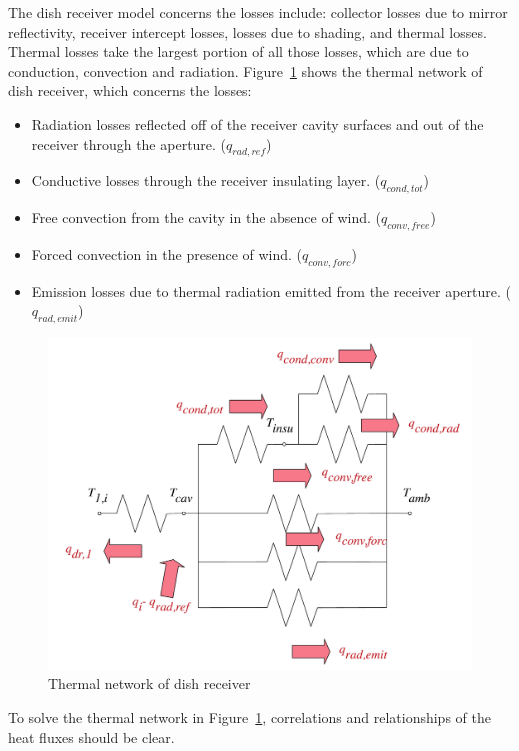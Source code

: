 The dish receiver model concerns the losses include: collector losses due to mirror reflectivity, receiver intercept losses, losses due to shading, and thermal losses. Thermal losses take the largest portion of all those losses, which are due to conduction, convection and radiation. Figure~\ref{fig:thermal-lose} shows the thermal network of dish receiver, which concerns the losses:
\begin{itemize}
	\item Radiation losses reflected off of the receiver cavity surfaces and out of the receiver through the aperture. ($q_{rad,ref}$)
	\item Conductive losses through the receiver insulating layer. ($q_{cond,tot}$)
	\item Free convection from the cavity in the absence of wind. ($q_{conv,free}$)
	\item Forced convection in the presence of wind. ($q_{conv,forc}$)
	\item Emission losses due to thermal radiation emitted from the receiver aperture. ($q_{rad,emit}$)
\end{itemize}

\noindent \begin{figure}[htbp]
\begin{center}
	\includegraphics[width = 0.7\columnwidth]{fig/thermalLosses.pdf}
	\caption{Thermal network of dish receiver}
	\label{fig:thermal-lose}
\end{center}
\end{figure}

To solve the thermal network in Figure~\ref{fig:thermal-lose}, correlations and relationships of the heat fluxes should be clear.

